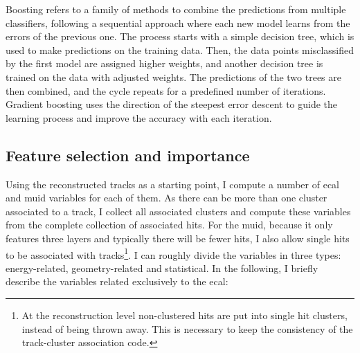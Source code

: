 Boosting refers to a family of methods to combine the predictions from multiple classifiers, following a sequential approach where each new model learns from the errors of the previous one. The process starts with a simple decision tree, which is used to make predictions on the training data. Then, the data points misclassified by the first model are assigned higher weights, and another decision tree is trained on the data with adjusted weights. The predictions of the two trees are then combined, and the cycle repeats for a predefined number of iterations. Gradient boosting uses the direction of the steepest error descent to guide the learning process and improve the accuracy with each iteration.

\subsection{Feature selection and importance}

Using the reconstructed tracks as a starting point, I compute a number of \gls{ecal} and \gls{muid} variables for each of them. As there can be more than one cluster associated to a track, I collect all associated clusters and compute these variables from the complete collection of associated hits. For the \gls{muid}, because it only features three layers and typically there will be fewer hits, I also allow single hits to be associated with tracks\footnote{At the reconstruction level non-clustered hits are put into single hit clusters, instead of being thrown away. This is necessary to keep the consistency of the track-cluster association code.}. I can roughly divide the variables in three types: energy-related, geometry-related and statistical. In the following, I briefly describe the variables related exclusively to the \gls{ecal}:

